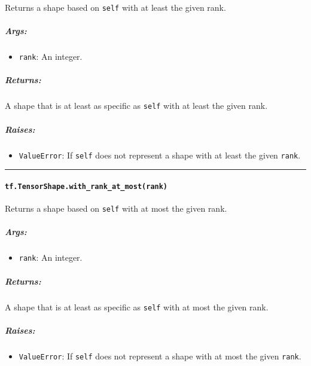Returns a shape based on \lstinline{self} with at least the given rank.

\subparagraph{Args: }\label{args-34}

\begin{itemize}
\tightlist
\item
  \lstinline{rank}: An integer.
\end{itemize}

\subparagraph{Returns: }\label{returns-35}

A shape that is at least as specific as \lstinline{self} with at least the
given rank.

\subparagraph{Raises: }\label{raises-19}

\begin{itemize}
\tightlist
\item
  \lstinline{ValueError}: If \lstinline{self} does not represent a shape with
  at least the given \lstinline{rank}.
\end{itemize}

\begin{center}\rule{0.5\linewidth}{\linethickness}\end{center}

\paragraph{\texorpdfstring{\lstinline{tf.TensorShape.with_rank_at_most(rank)}
}{tf.TensorShape.with_rank_at_most(rank) }}\label{tf.tensorshape.withux5frankux5fatux5fmostrank}

Returns a shape based on \lstinline{self} with at most the given rank.

\subparagraph{Args: }\label{args-35}

\begin{itemize}
\tightlist
\item
  \lstinline{rank}: An integer.
\end{itemize}

\subparagraph{Returns: }\label{returns-36}

A shape that is at least as specific as \lstinline{self} with at most the
given rank.

\subparagraph{Raises: }\label{raises-20}

\begin{itemize}
\tightlist
\item
  \lstinline{ValueError}: If \lstinline{self} does not represent a shape with
  at most the given \lstinline{rank}.
\end{itemize}

